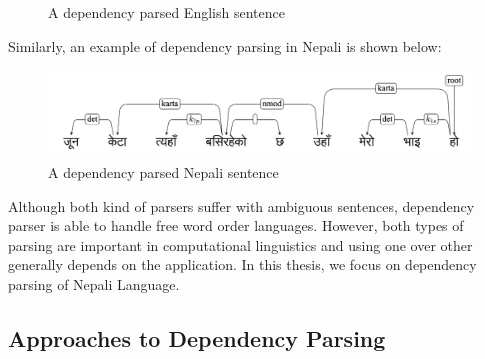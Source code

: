 \begin{description}
\begin{figure}[!h]
        \caption{A dependency parsed English sentence\cite{stanfordLec}}
        \label{fig:dep_example}
    \end{figure}
    \newline
    Similarly, an example of dependency parsing in Nepali is shown below:
    \begin{figure}[!h]
        \center
        \includegraphics[scale=0.2]{images/dep_tree_example}
        \caption{A dependency parsed Nepali sentence\cite{yajnik1}}
        \label{fig:dep_example_eng}
    \end{figure}
    \newline
\end{description}
Although both kind of parsers suffer with ambiguous sentences, dependency
parser is able to handle free word order languages. However, both types of
parsing are important in computational linguistics and using one over other
generally depends on the application. In this thesis, we focus on dependency
parsing of Nepali Language.

\subsection*{Approaches to Dependency Parsing}
